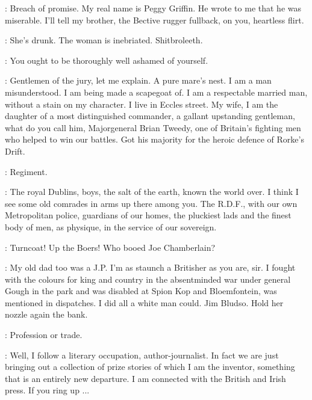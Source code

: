 \Martha:
Breach of promise.
My real name is Peggy Griffin.
He wrote to me that he was miserable.
I'll tell my brother, the Bective rugger fullback, on you, heartless flirt.

\Bloom:
She's drunk.
The woman is inebriated.
Shitbroleeth.

\SecondWatch:
You ought to be thoroughly well ashamed of yourself.

\Bloom:
Gentlemen of the jury, let me explain.
A pure mare's nest.
I am a man misunderstood.
I am being made a scapegoat of.
I am a respectable married man, without a stain on my character.
I live in Eccles street.
My wife, I am the daughter of a most distinguished commander,
a gallant upstanding gentleman,
what do you call him, Majorgeneral Brian Tweedy,
one of Britain's fighting men who helped to win our battles.
Got his majority for the heroic defence of Rorke's Drift.

\FirstWatch:
Regiment.

\Bloom:
The royal Dublins, boys, the salt of the earth, known the world over.
I think I see some old comrades in arms up there among you.
The R.D.F., with our own Metropolitan police,
guardians of our homes, the pluckiest lads and the finest body of men,
as physique, in the service of our sovereign.

\Voice:
Turncoat! Up the Boers! Who booed Joe Chamberlain?

\Bloom:
My old dad too was a J.P.
I'm as staunch a Britisher as you are, sir.
I fought with the colours for king and country
in the absentminded war under general Gough in the park
and was disabled at Spion Kop and Bloemfontein,
was mentioned in dispatches.
I did all a white man could.
Jim Bludso.
Hold her nozzle again the bank.

\FirstWatch:
Profession or trade.

\Bloom:
Well, I follow a literary occupation, author-journalist.
In fact we are just bringing out a collection of prize stories
of which I am the inventor, something that is an entirely new departure.
I am connected with the British and Irish press.
If you ring up ...


